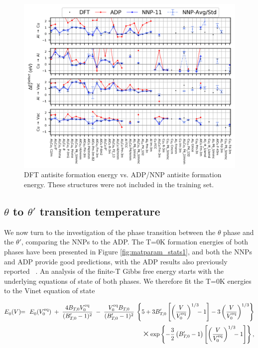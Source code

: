 \documentclass{article}
\begin{document}
\begin{figure}[H]%
\centering%
\includegraphics[width=1\textwidth,center]{figures/antisite_vacancies.png}%
\caption{DFT antisite formation energy vs. ADP/NNP antisite formation energy.
These structures were not included in the training set.}%
\label{fig:antisite_plot}
\end{figure}

\subsection{$\theta$ to $\theta'$ transition temperature} \label{sct:thetap_theta_transition}
We now turn to the investigation of the phase transition between the $\theta$ phase and the $\theta'$, comparing the NNPs to the ADP. The T=0K formation energies of both phases have been presented in Figure \ref{fig:matparam_stats1}, and both the NNPs and ADP provide good predictions, with the ADP results also previously reported ~\cite{Apostol2011}. An analysis of the finite-T Gibbs free energy starts with the underlying equations of state of both phases. We therefore fit the T=0K energies to the Vinet equation of state

\begin{eqnarray}
\label{Vinet}
E^{}_{0}(V) &\!\!=\!\!& E^{}_{0}(V^{\rm eq}_0) \;+\; \frac{4B_{T\!,0}V^{\rm eq}_0}{(B_{T\!,0}' -1)^2} \;-\; \frac{V^{\rm eq}_0B_{T\!,0}}{(B_{T\!,0}'
-1)^2} \:\left\{ 5+3B_{T\!,0}'\left[ \left(\frac{V}{V^{\rm eq}_0}\right)^{1/3}\!\!\!-1 \right]-3\left(\frac{V}{V^{\rm eq}_0}\right)^{1/3} \right\}\nonumber\\[.1cm]
&& \hspace{5.05cm}\text{\Large$\times$} \exp \left\{ -\frac{3}{2}\left(B_{T\!,0}'-1\right)\left[ \left(\frac{V}{V^{\rm eq}_0}\right)^{1/3}\!\!\!-1 \right] \right\},
\end{eqnarray}
\end{document}
